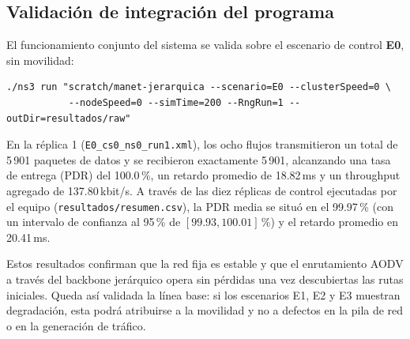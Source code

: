 \subsection{Validación de integración del programa}

El funcionamiento conjunto del sistema se valida sobre el escenario de control \textbf{E0}, sin movilidad:

{\footnotesize
\begin{verbatim}
./ns3 run "scratch/manet-jerarquica --scenario=E0 --clusterSpeed=0 \
           --nodeSpeed=0 --simTime=200 --RngRun=1 --outDir=resultados/raw"
\end{verbatim}
}

En la réplica 1 (\texttt{E0\_cs0\_ns0\_run1.xml}), los ocho flujos transmitieron un total de 5\,901 paquetes de datos y se recibieron exactamente 5\,901, alcanzando una tasa de entrega (PDR) del 100.0\,\%, un retardo promedio de 18.82\,ms y un throughput agregado de 137.80\,kbit/s. A través de las diez réplicas de control ejecutadas por el equipo (\texttt{resultados/resumen.csv}), la PDR media se situó en el 99.97\,\% (con un intervalo de confianza al 95\,\% de $[99.93, 100.01]$\,\%) y el retardo promedio en 20.41\,ms.

Estos resultados confirman que la red fija es estable y que el enrutamiento AODV a través del backbone jerárquico opera sin pérdidas una vez descubiertas las rutas iniciales. Queda así validada la línea base: si los escenarios E1, E2 y E3 muestran degradación, esta podrá atribuirse a la movilidad y no a defectos en la pila de red o en la generación de tráfico.
